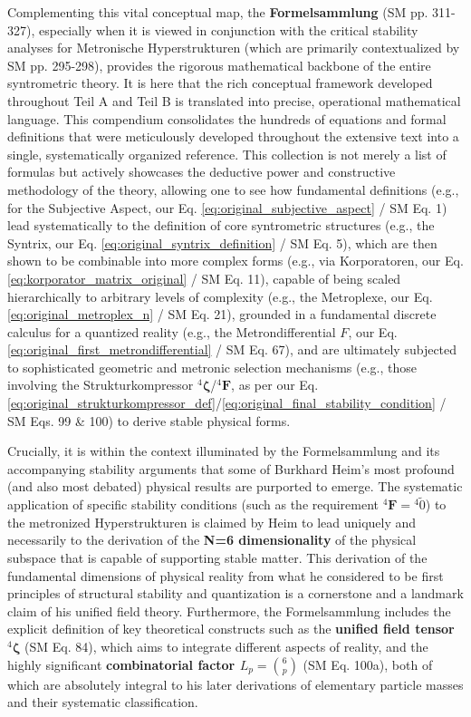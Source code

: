 \documentclass[12pt]{article}
\newcommand{\metrondifferential}{F} %
\newcommand{\strukturkompressor}{{}^4\bm{\zeta}}
\newcommand{\metronisiertekondensor}[1]{{}^{#1}\mathbf{F}} %
\begin{document}
Complementing this vital conceptual map, the \textbf{Formelsammlung} (SM pp. 311-327), especially when it is viewed in conjunction with the critical stability analyses for Metronische Hyperstrukturen (which are primarily contextualized by SM pp. 295-298), provides the rigorous mathematical backbone of the entire syntrometric theory. It is here that the rich conceptual framework developed throughout Teil A and Teil B is translated into precise, operational mathematical language. This compendium consolidates the hundreds of equations and formal definitions that were meticulously developed throughout the extensive text into a single, systematically organized reference. This collection is not merely a list of formulas but actively showcases the deductive power and constructive methodology of the theory, allowing one to see how fundamental definitions (e.g., for the Subjective Aspect, our Eq. \eqref{eq:original_subjective_aspect} / SM Eq. 1) lead systematically to the definition of core syntrometric structures (e.g., the Syntrix, our Eq. \eqref{eq:original_syntrix_definition} / SM Eq. 5), which are then shown to be combinable into more complex forms (e.g., via Korporatoren, our Eq. \eqref{eq:korporator_matrix_original} / SM Eq. 11), capable of being scaled hierarchically to arbitrary levels of complexity (e.g., the Metroplexe, our Eq. \eqref{eq:original_metroplex_n} / SM Eq. 21), grounded in a fundamental discrete calculus for a quantized reality (e.g., the Metrondifferential \( \metrondifferential \), our Eq. \eqref{eq:original_first_metrondifferential} / SM Eq. 67), and are ultimately subjected to sophisticated geometric and metronic selection mechanisms (e.g., those involving the Strukturkompressor \( \strukturkompressor \)/\( \metronisiertekondensor{4} \), as per our Eq. \eqref{eq:original_strukturkompressor_def}/\eqref{eq:original_final_stability_condition} / SM Eqs. 99 \& 100) to derive stable physical forms.

Crucially, it is within the context illuminated by the Formelsammlung and its accompanying stability arguments that some of Burkhard Heim's most profound (and also most debated) physical results are purported to emerge. The systematic application of specific stability conditions (such as the requirement \( \metronisiertekondensor{4} = {}^{4}\tilde{0} \)) to the metronized Hyperstrukturen is claimed by Heim to lead uniquely and necessarily to the derivation of the \textbf{N=6 dimensionality} of the physical subspace that is capable of supporting stable matter. This derivation of the fundamental dimensions of physical reality from what he considered to be first principles of structural stability and quantization is a cornerstone and a landmark claim of his unified field theory. Furthermore, the Formelsammlung includes the explicit definition of key theoretical constructs such as the \textbf{unified field tensor \( \strukturkompressor \)} (SM Eq. 84), which aims to integrate different aspects of reality, and the highly significant \textbf{combinatorial factor \( L_p = \binom{6}{p} \)} (SM Eq. 100a), both of which are absolutely integral to his later derivations of elementary particle masses and their systematic classification.
\end{document}
